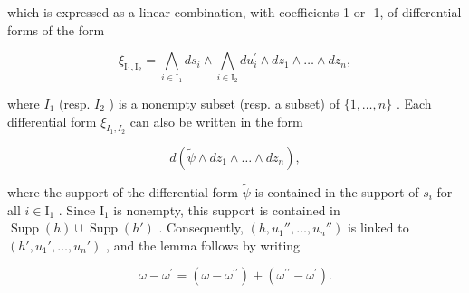 which is expressed as a linear combination, with coefficients 1 or -1, of differential forms of the form

\[
\xi_ {\mathrm{I} _ {1}, \mathrm{I} _ {2}} = \bigwedge_ {i \in \mathrm{I} _ {1}} d s _ {i} \wedge \bigwedge_ {i \in \mathrm{I} _ {2}} d u _ {i} ^ {\prime} \wedge d z _ {1} \wedge \dots \wedge d z _ {n},
\]

where \(I_{1}\) (resp. \(I_{2}\) ) is a nonempty subset (resp. a subset) of \(\{1,\ldots,n\}\) . Each differential form \(\xi_{I_{1},I_{2}}\) can also be written in the form

\[
d (\widetilde {\psi} \wedge d z _ {1} \wedge \dots \wedge d z _ {n}),
\]

where the support of the differential form \(\widetilde{\psi}\) is contained in the support of \(s_i\) for all \(i \in \mathrm{I}_1\) . Since \(\mathrm{I}_1\) is nonempty, this support is contained in \(\operatorname{Supp}(h) \cup \operatorname{Supp}(h')\) . Consequently, \((h, u_1'', \ldots, u_n'')\) is linked to \((h', u_1', \ldots, u_n')\) , and the lemma follows by writing

\[
\omega - \omega^ {\prime} = (\omega - \omega^ {\prime \prime}) + (\omega^ {\prime \prime} - \omega^ {\prime}).
\]

